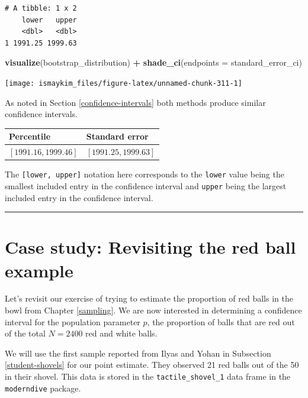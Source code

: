 \documentclass[12pt, krantz2,]{krantz}
\makeatletter
\newenvironment{Shaded}{\begin{snugshade}}{\end{snugshade}}
\newcommand{\DataTypeTok}[1]{\textcolor[rgb]{0.27,0.27,0.27}{#1}}
\newcommand{\KeywordTok}[1]{\textcolor[rgb]{0.27,0.27,0.27}{\textbf{#1}}}
\newcommand{\NormalTok}[1]{#1}
\newcommand{\OperatorTok}[1]{\textcolor[rgb]{0.43,0.43,0.43}{\textbf{#1}}}
\newcommand{\StringTok}[1]{\textcolor[rgb]{0.5,0.5,0.5}{#1}}
\newenvironment{kframe}{%
\medskip{}
\setlength{\fboxsep}{.8em}
 \def\at@end@of@kframe{}%
 \ifinner\ifhmode%
  \def\at@end@of@kframe{\end{minipage}}%
  \begin{minipage}{\columnwidth}%
 \fi\fi%
 \def\FrameCommand##1{\hskip\@totalleftmargin \hskip-\fboxsep
 \colorbox{shadecolor}{##1}\hskip-\fboxsep
     \hskip-\linewidth \hskip-\@totalleftmargin \hskip\columnwidth}%
 \MakeFramed {\advance\hsize-\width
   \@totalleftmargin\z@ \linewidth\hsize
   \@setminipage}}%
 {\par\unskip\endMakeFramed%
 \at@end@of@kframe}
\renewenvironment{Shaded}{\begin{kframe}}{\end{kframe}}
\makeatother
\begin{document}
\begin{verbatim}
# A tibble: 1 x 2
    lower   upper
    <dbl>   <dbl>
1 1991.25 1999.63
\end{verbatim}

\begin{Shaded}
\begin{Highlighting}[]
\KeywordTok{visualize}\NormalTok{(bootstrap_distribution) }\OperatorTok{+}\StringTok{ }
\StringTok{  }\KeywordTok{shade_ci}\NormalTok{(}\DataTypeTok{endpoints =}\NormalTok{ standard_error_ci)}
\end{Highlighting}
\end{Shaded}

\begin{center}\texttt{[image: ismaykim\_files/figure-latex/unnamed-chunk-311-1]} \end{center}

As noted in Section \ref{confidence-intervals} both methods produce similar confidence intervals.

\begin{longtable}[]{@{}ll@{}}
\toprule
Percentile & Standard error\tabularnewline
\midrule
\endhead
\([1991.16, 1999.46]\) & \([1991.25, 1999.63]\)\tabularnewline
\bottomrule
\end{longtable}

The \texttt{{[}lower,\ upper{]}} notation here corresponds to the \texttt{lower} value being the smallest included entry in the confidence interval and \texttt{upper} being the largest included entry in the confidence interval.

\begin{center}\rule{0.5\linewidth}{\linethickness}\end{center}

\hypertarget{one-prop-ci}{%
\section{Case study: Revisiting the red ball example}\label{one-prop-ci}}

Let's revisit our exercise of trying to estimate the proportion of red balls in the bowl from Chapter \ref{sampling}. We are now interested in determining a confidence interval for the population parameter \(p\), the proportion of balls that are red out of the total \(N = 2400\) red and white balls.

We will use the first sample reported from Ilyas and Yohan in Subsection \ref{student-shovels} for our point estimate. They observed 21 red balls out of the 50 in their shovel. This data is stored in the \texttt{tactile\_shovel\_1} data frame in the \texttt{moderndive} package.
\end{document}
